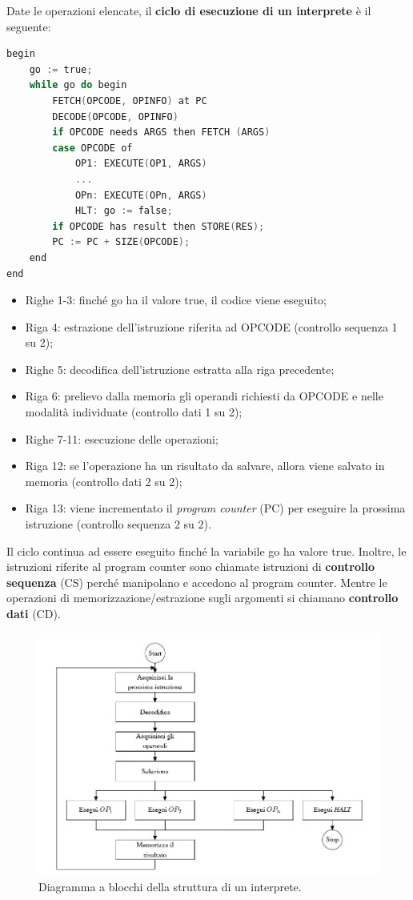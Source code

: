 \documentclass[a4paper]{article}
\begin{document}
	Date le operazioni elencate, il \textcolor{Red3}{\textbf{ciclo di esecuzione di un interprete}} è il seguente:
	\begin{lstlisting}[language=C]
begin
	go := true;
	while go do begin
		FETCH(OPCODE, OPINFO) at PC
		DECODE(OPCODE, OPINFO)
		if OPCODE needs ARGS then FETCH (ARGS)
		case OPCODE of
			OP1: EXECUTE(OP1, ARGS)
			...
			OPn: EXECUTE(OPn, ARGS)
			HLT: go := false;
		if OPCODE has result then STORE(RES);
		PC := PC + SIZE(OPCODE);
	end
end \end{lstlisting}
	\begin{itemize}
		\item Righe 1-3: finché \textsf{go} ha il valore \textsf{true}, il codice viene eseguito;
		\item Riga 4: estrazione dell'istruzione riferita ad \textsf{OPCODE} (controllo sequenza 1 su 2);
		\item Righe 5: decodifica dell'istruzione estratta alla riga precedente;
		\item Riga 6: prelievo dalla memoria gli operandi richiesti da \textsf{OPCODE} e nelle modalità individuate (controllo dati 1 su 2);
		\item Righe 7-11: esecuzione delle operazioni;
		\item Riga 12: se l'operazione ha un risultato da salvare, allora viene salvato in memoria (controllo dati 2 su 2);
		\item Riga 13: viene incrementato il \emph{program counter} (PC) per eseguire la prossima istruzione (controllo sequenza 2 su 2).
	\end{itemize}
	Il ciclo continua ad essere eseguito finché la variabile \textsf{go} ha valore \textsf{true}. Inoltre, le istruzioni riferite al program counter sono chiamate istruzioni di \textbf{controllo sequenza} (CS) perché manipolano e accedono al program counter. Mentre le operazioni di memorizzazione/estrazione sugli argomenti si chiamano \textbf{controllo dati} (CD).
	\begin{figure}[!htp]
		\centering
		\includegraphics[width=\textwidth]{img/ciclo_esecuzione_interprete.png}
		\caption{Diagramma a blocchi della struttura di un interprete.}
	\end{figure}\newpage
\end{document}
